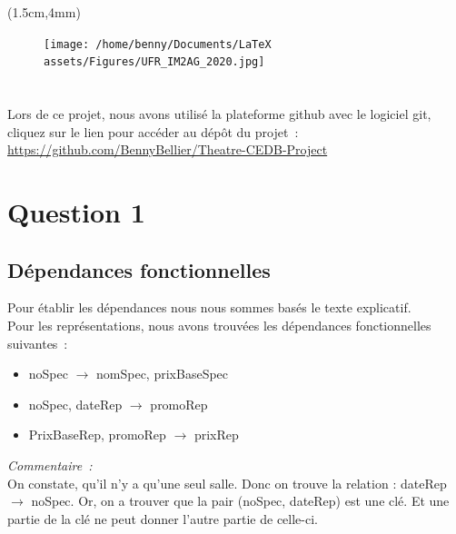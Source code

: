 \documentclass[a4paper, 10pt, twoside]{article}
\begin{document}
  \begin{textblock*}{3cm}(1.5cm,4mm)
    \begin{figure}[h]
      \texttt{[image: /home/benny/Documents/LaTeX assets/Figures/UFR\_IM2AG\_2020.jpg]}\\[.1cm] %
    \end{figure}
  \end{textblock*}
\section*{}

Lors de ce projet, nous avons utilisé la plateforme github avec le logiciel git,
cliquez sur le lien pour accéder au dépôt du projet~:
\href{https://github.com/BennyBellier/Theatre-CEDB-Project}{https://github.com/BennyBellier/Theatre-CEDB-Project}

\section{Question 1}
  \subsection{Dépendances fonctionnelles}
  Pour établir les dépendances nous nous sommes basés le texte explicatif.\\

  \noindent Pour  les représentations, nous avons trouvées les dépendances fonctionnelles suivantes~:
  \begin{itemize}
    \item noSpec $\rightarrow$ nomSpec, prixBaseSpec
    \item noSpec, dateRep $\rightarrow$ promoRep
    \item PrixBaseRep, promoRep $\rightarrow$ prixRep
  \end{itemize}
  \emph{Commentaire~:}\\
  On constate, qu'il n'y a qu'une seul salle. Donc on trouve la relation :
  dateRep $\rightarrow$ noSpec. Or, on a trouver que la pair (noSpec, dateRep) est une
  clé. Et une partie de la clé ne peut donner l'autre partie de celle-ci.\\
\end{document}
